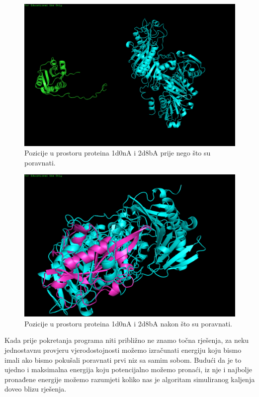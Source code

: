 \documentclass[times, utf8, zavrsni]{fer}
\begin{document}
\begin{figure}
\centering
\includegraphics[scale=0.4]{res/nonalligned.png}
\caption[Proteini 1d0nA i 2d8bA prije poravnanja]{Pozicije u prostoru 
proteina 1d0nA i 2d8bA prije nego što su poravnati.}
\label{figure:prije_poravnanja}
\end{figure}

\begin{figure}
\centering
\includegraphics[scale=0.4]{res/alligned.png}
\caption[Proteini 1d0nA i 2d8bA nakon poravnanja]{Pozicije u prostoru 
proteina 1d0nA i 2d8bA nakon što su poravnati.}
\label{figure:poslije_poravnanja}
\end{figure}

Kada prije pokretanja programa niti približno ne znamo točna rješenja,
za neku jednostavnu provjeru vjerodostojnosti možemo
izračunati energiju koju bismo imali ako bismo pokušali
poravnati prvi niz sa samim sobom.
Budući da je to ujedno i maksimalna energija koju potencijalno
možemo pronaći, iz nje i najbolje pronađene energije možemo
razumjeti koliko nas je algoritam simuliranog kaljenja doveo
blizu rješenja. 
\end{document}
